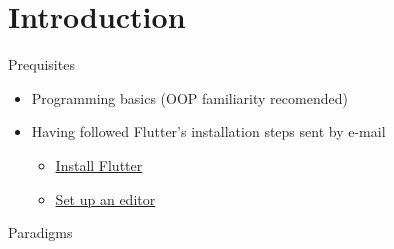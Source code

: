 \section*{Introduction}

\begin{frame}{Prequisites}
    \begin{itemize}
        \item Programming basics (OOP familiarity recomended)
        \item Having followed Flutter's installation steps sent by e-mail
        \begin{itemize}
            \item \href{https://docs.flutter.dev/get-started/install}{Install Flutter}
            \item \href{https://docs.flutter.dev/get-started/editor}{Set up an editor}
        \end{itemize}
    \end{itemize}
\end{frame}

\begin{frame}{Paradigms}

\end{frame}